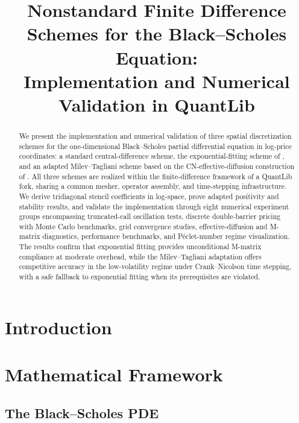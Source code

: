 \documentclass[11pt]{article}
\title{Nonstandard Finite Difference Schemes for the Black--Scholes Equation:\\
Implementation and Numerical Validation in QuantLib}
\author{}
\date{}
\theoremstyle{definition}
\theoremstyle{remark}
\begin{document}
\maketitle

\begin{abstract}
We present the implementation and numerical validation of three spatial
discretization schemes for the one-dimensional Black--Scholes partial
differential equation in log-price coordinates: a standard central-difference
scheme, the exponential-fitting scheme of \citet{Duffy2004}, and an adapted
Milev--Tagliani scheme based on the CN-effective-diffusion construction
of \citet{MilevTagliani2010a,MilevTagliani2010b}. All three schemes are
realized within the finite-difference framework of a QuantLib fork, sharing a
common mesher, operator assembly, and time-stepping infrastructure. We derive
tridiagonal stencil coefficients in log-space, prove adapted positivity and
stability results, and validate the implementation through eight numerical
experiment groups encompassing truncated-call oscillation tests, discrete
double-barrier pricing with Monte Carlo benchmarks, grid convergence studies,
effective-diffusion and M-matrix diagnostics, performance benchmarks, and
P\'eclet-number regime visualization. The results confirm that
exponential fitting provides unconditional M-matrix compliance at moderate
overhead, while the Milev--Tagliani adaptation offers competitive accuracy
in the low-volatility regime under Crank--Nicolson time stepping, with a
safe fallback to exponential fitting when its prerequisites are violated.
\end{abstract}

\section{Introduction}
\label{sec:intro}


\section{Mathematical Framework}
\label{sec:math}

\subsection{The Black--Scholes PDE}
\label{sec:bspde}
\end{document}
